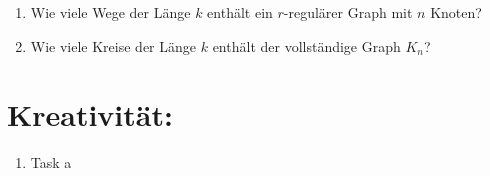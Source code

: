 \begin{enumerate}[label=(\alph*)]
        \item Wie viele Wege der Länge $k$ enthält ein $r$-regulärer Graph mit $n$ Knoten? \\
        
        \item Wie viele Kreise der Länge $k$ enthält der vollständige Graph $K_n$? \\
        
        
    \end{enumerate}
    \section*{Kreativität:}
    \begin{enumerate}[label=(\alph*)]
        \item Task a
    \end{enumerate}
